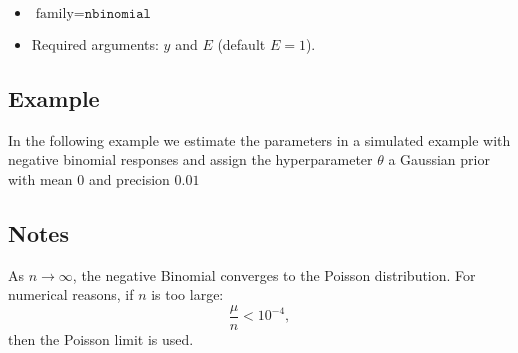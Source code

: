 \documentclass[a4paper,11pt]{article}
\begin{document}
\begin{itemize}
\item $\text{family}=\texttt{nbinomial}$
\item Required arguments: $y$ and $E$ (default $E=1$).
\end{itemize}

\subsection*{Example}

In the following example we estimate the parameters in a simulated
example with negative binomial responses and assign the hyperparameter
$\theta$ a Gaussian prior with mean $0$ and precision $0.01$


\subsection*{Notes}

As $n\rightarrow\infty$, the negative Binomial converges to the
Poisson distribution. For numerical reasons, if $n$ is too large:
\begin{displaymath}
    \frac{\mu}{n} < 10^{-4},
\end{displaymath}
then the Poisson limit is used.
\end{document}
